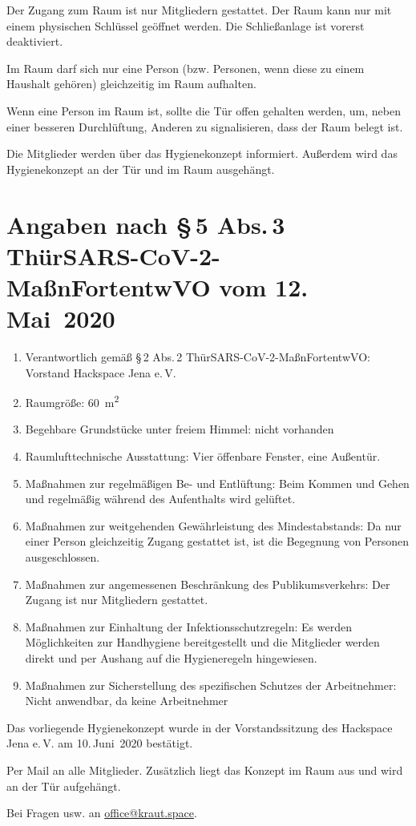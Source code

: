 \documentclass[a4paper,12pt,parskip=half]{scrartcl}
\begin{document}
Der Zugang zum Raum ist nur Mitgliedern gestattet. Der Raum kann nur mit einem
physischen Schlüssel geöffnet werden. Die Schließanlage ist vorerst deaktiviert.

Im Raum darf sich nur eine Person (bzw. Personen, wenn diese zu einem Haushalt gehören) gleichzeitig im Raum aufhalten.

Wenn eine Person im Raum ist, sollte die Tür offen gehalten werden, um, neben einer besseren Durchlüftung, Anderen zu signalisieren, dass der Raum belegt ist. 

Die Mitglieder werden über das Hygienekonzept informiert. Außerdem wird das Hygienekonzept an der Tür und im Raum ausgehängt.

\section*{Angaben nach §\,5 Abs.\,3 ThürSARS-CoV-2-MaßnFortentwVO vom
  12.\,Mai~2020}

\begin{enumerate}
 \item Verantwortlich gemäß §\,2 Abs.\,2 ThürSARS-CoV-2-MaßnFortentwVO: Vorstand Hackspace Jena e.\,V.
 \item Raumgröße: \SI{60}{\square\metre}
 \item Begehbare Grundstücke unter freiem Himmel: nicht vorhanden
 \item Raumlufttechnische Ausstattung: Vier öffenbare Fenster, eine Außentür.
 \item Maßnahmen zur regelmäßigen Be- und Entlüftung: Beim Kommen und Gehen und regelmäßig während des Aufenthalts wird gelüftet.
 \item Maßnahmen zur weitgehenden Gewährleistung des Mindestabstands: Da nur einer Person gleichzeitig Zugang gestattet ist, ist die Begegnung von Personen ausgeschlossen.
 \item Maßnahmen zur angemessenen Beschränkung des Publikumsverkehrs: Der Zugang ist nur Mitgliedern gestattet.
 \item Maßnahmen zur Einhaltung der Infektionsschutzregeln: Es werden Möglichkeiten zur Handhygiene bereitgestellt und die Mitglieder werden direkt und per Aushang auf die Hygieneregeln hingewiesen.
 \item Maßnahmen zur Sicherstellung des spezifischen Schutzes der Arbeitnehmer: Nicht anwendbar, da keine Arbeitnehmer
\end{enumerate}

Das vorliegende Hygienekonzept wurde in der Vorstandssitzung des Hackspace Jena e.\,V. am 10.\,Juni~2020 bestätigt.

Per Mail an alle Mitglieder. Zusätzlich liegt das Konzept im Raum aus und wird an der Tür aufgehängt.

Bei Fragen usw. an \href{mailto:office@kraut.space}{office@kraut.space}.

\begin{versionhistory}
\end{versionhistory}
\end{document}
